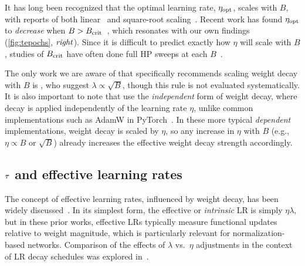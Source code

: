 It has long been recognized that the optimal learning rate, $\eta_{\text{opt}}$, scales
with $B$, with reports of both
linear~\citep{krizhevsky2014one,chen2016revisiting,smith2017bayesian,smith2018dont}
and square-root
scaling~\citep{hoffer2017train,you2019large,malladi2022sdes}.
%
Recent work has found $\eta_{\text{opt}}$ to \emph{decrease} when $B
> B_{\text{crit}}$~\citep{li2024surge,filatov2024time}, which resonates with our
own findings (\cref{fig:tepochs}, $\text{\emph{right}}$).
%
%
Since it is difficult to predict exactly how $\eta$ will scale with
$B$, studies of $B_{\text{crit}}$ have often done full HP sweeps at each
$B$~\citep{mccandlish2018empirical,shallue2019measuring}.

The only work we are aware of that specifically recommends scaling
weight decay with $B$ is \citet{loshchilov2017decoupled}, who suggest
$\lambda \propto \sqrt{B}$, though this rule is not evaluated
systematically. It is also important to note that
\citet{loshchilov2017decoupled} use the \emph{independent} form of
weight decay, where decay is applied independently of the learning
rate $\eta$, unlike common implementations such as AdamW in
PyTorch~\citep{wortsman2023small}. In these more typical
\emph{dependent} implementations, weight decay is scaled by $\eta$, so
any increase in $\eta$ with $B$ (e.g., $\eta \propto B$ or $\sqrt{B}$)
already increases the effective weight decay strength accordingly.


\subsection{$\tau$ and effective learning rates}

The concept of effective learning rates, influenced by weight decay,
has been widely
discussed~\citep{van2017l2,hoffer2018norm,zhang2018three,chiley2019online,li2019exponential,wan2020spherical,kosson2023rotational,dangelo2024why}.
%
In its simplest form, the effective or \emph{intrinsic} LR is simply
$\eta\lambda$, but in these prior works, effective LRs typically
measure functional updates relative to weight magnitude, which is
particularly relevant for normalization-based networks.
%
Comparison of the effects of $\lambda$ vs.\ $\eta$ adjustments in the
context of LR decay schedules was explored
in~\citet{bergsma2025straight}.

